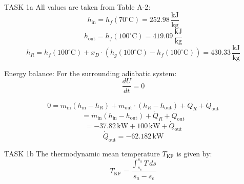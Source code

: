 TASK 1a  
All values are taken from Table A-2:  
\[
h_{\text{in}} = h_f(70^\circ\text{C}) = 252.98 \, \frac{\text{kJ}}{\text{kg}}
\]  
\[
h_{\text{out}} = h_f(100^\circ\text{C}) = 419.09 \, \frac{\text{kJ}}{\text{kg}}
\]  
\[
h_R = h_f(100^\circ\text{C}) + x_D \cdot \left(h_g(100^\circ\text{C}) - h_f(100^\circ\text{C})\right) = 430.33 \, \frac{\text{kJ}}{\text{kg}}
\]  

Energy balance:  
For the surrounding adiabatic system:  
\[
\frac{dU}{dt} = 0
\]  

\[
0 = \dot{m}_{\text{in}} \left(h_{\text{in}} - h_R\right) + m_{\text{out}} \cdot \left(h_R - h_{\text{out}}\right) + \dot{Q}_R + \dot{Q}_{\text{out}}
\]  
\[
= \dot{m}_{\text{in}} \left(h_{\text{in}} - h_{\text{out}}\right) + \dot{Q}_R + \dot{Q}_{\text{out}}
\]  
\[
= -37.82 \, \text{kW} + 100 \, \text{kW} + \dot{Q}_{\text{out}}
\]  
\[
\dot{Q}_{\text{out}} = -62.182 \, \text{kW}
\]  

TASK 1b  
The thermodynamic mean temperature \( T_{\text{KF}} \) is given by:  
\[
T_{\text{KF}} = \frac{\int_{s_e}^{s_a} T \, ds}{s_a - s_e}
\]  